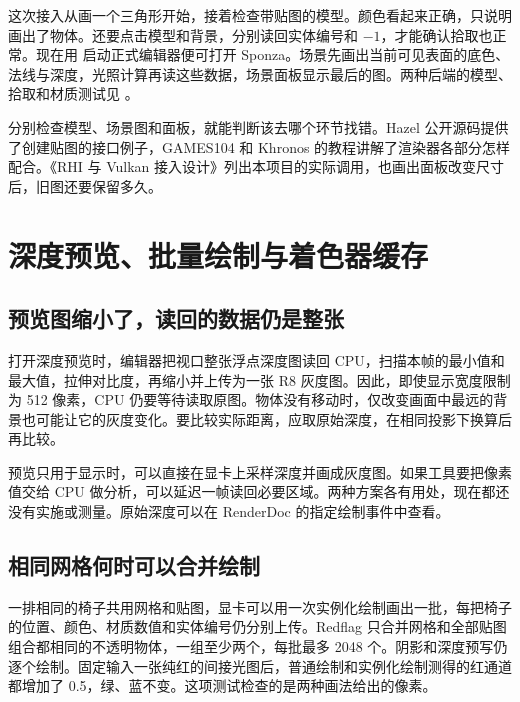 这次接入从画一个三角形开始，接着检查带贴图的模型。颜色看起来正确，只说明画出了物体。还要点击模型和背景，分别读回实体编号和 $-1$，才能确认拾取也正常。现在用  启动正式编辑器便可打开 Sponza。场景先画出当前可见表面的底色、法线与深度，光照计算再读这些数据，场景面板显示最后的图。两种后端的模型、拾取和材质测试见 。

分别检查模型、场景图和面板，就能判断该去哪个环节找错。Hazel 公开源码提供了创建贴图的接口例子，GAMES104 和 Khronos 的教程讲解了渲染器各部分怎样配合。《RHI 与 Vulkan 接入设计》列出本项目的实际调用，也画出面板改变尺寸后，旧图还要保留多久。

\newpage
\section{深度预览、批量绘制与着色器缓存}
\subsection{预览图缩小了，读回的数据仍是整张}
打开深度预览时，编辑器把视口整张浮点深度图读回 CPU，扫描本帧的最小值和最大值，拉伸对比度，再缩小并上传为一张 R8 灰度图。因此，即使显示宽度限制为 512 像素，CPU 仍要等待读取原图。物体没有移动时，仅改变画面中最远的背景也可能让它的灰度变化。要比较实际距离，应取原始深度，在相同投影下换算后再比较。

预览只用于显示时，可以直接在显卡上采样深度并画成灰度图。如果工具要把像素值交给 CPU 做分析，可以延迟一帧读回必要区域。两种方案各有用处，现在都还没有实施或测量。原始深度可以在 RenderDoc 的指定绘制事件中查看。

\subsection{相同网格何时可以合并绘制}
一排相同的椅子共用网格和贴图，显卡可以用一次实例化绘制画出一批，每把椅子的位置、颜色、材质数值和实体编号仍分别上传。Redflag 只合并网格和全部贴图组合都相同的不透明物体，一组至少两个，每批最多 2048 个。阴影和深度预写仍逐个绘制。固定输入一张纯红的间接光图后，普通绘制和实例化绘制测得的红通道都增加了 0.5，绿、蓝不变。这项测试检查的是两种画法给出的像素。

